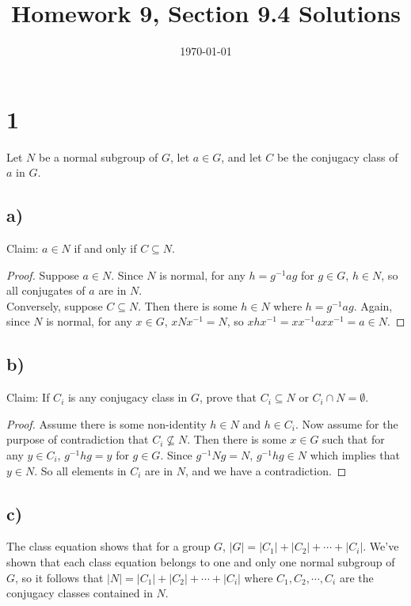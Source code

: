 \documentclass{article}
\title{\textbf{Homework 9, Section 9.4 Solutions}}
\date{}
\date\today
\begin{document}
\maketitle %

\thispagestyle{firstpage}
\section*{1}

Let $N$ be a normal subgroup of $G$, let $a \in G$, and let $C$ be the conjugacy 
class of $a$ in $G$. 

\subsection*{a)} 
Claim: $a \in N$ if and only if $C \subseteq N$. 

\begin{proof}
    Suppose $a \in N$.  Since $N$ is normal,
     for any $h = g^{-1}ag$ for $g \in G$, $h \in N$, so all conjugates of 
     $a$ are in $N$. \\ 
     Conversely, suppose $C \subseteq N$.  Then there is some $h \in N$ where 
     $h = g^{-1}ag$.  Again, since $N$ is normal, for any $x \in G$, $xNx^{-1} = N$, 
     so $xhx^{-1} = xx^{-1}axx^{-1} = a \in N$.
\end{proof}

\subsection*{b)} 
Claim: If $C_i$ is any conjugacy class in $G$, prove that $C_i \subseteq N$ 
or $C_i \cap N = \emptyset$.

\begin{proof}
    Assume there is some non-identity $h \in N$ and $h \in C_i$.  Now assume 
    for the purpose of contradiction that $C_i \nsubseteq N$.  Then there is 
    some $x \in G$ such that for any $y \in C_i$, $g^{-1}hg = y$ for $g \in G$.  
    Since $g^{-1}Ng = N$, $g^{-1}hg \in N$ which implies that $y \in N$.  So all 
    elements in $C_i$ are in $N$, and we have a contradiction.
\end{proof}

\subsection*{c)} 
The class equation shows that for a group $G$, $|G| = |C_1| + |C_2| + \cdots + |C_i|$.  
We've shown that each class equation belongs to one and only one normal subgroup of $G$, 
so it follows that $|N| = |C_1| + |C_2| + \cdots + |C_i|$ where $C_1, C_2, \cdots, C_i$ 
are the conjugacy classes contained in $N$.
\end{document}

